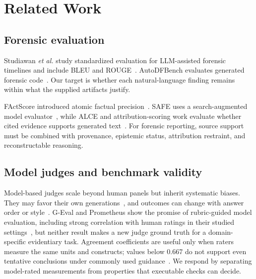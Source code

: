 \documentclass[conference]{IEEEtran}
\begin{document}
\section{Related Work}
\subsection{Forensic evaluation}
Studiawan \emph{et al.} study standardized evaluation for LLM-assisted forensic
timelines and include BLEU and ROUGE~\cite{studiawan2025}. AutoDFBench evaluates
generated forensic code~\cite{autodfbench}. Our target is whether each
natural-language finding remains within what the supplied artifacts justify.

FActScore introduced atomic factual precision~\cite{factscore}. SAFE uses a
search-augmented model evaluator~\cite{safe}, while ALCE and attribution-scoring
work evaluate whether cited evidence supports generated text~\cite{alce,attrscore}.
For forensic reporting, source support must be combined with provenance,
epistemic status, attribution restraint, and reconstructable reasoning.

\subsection{Model judges and benchmark validity}
Model-based judges scale beyond human panels but inherit systematic biases.
They may favor their own generations~\cite{panickssery2024}, and outcomes can
change with answer order or style~\cite{zheng2023,faireval}. G-Eval and
Prometheus show the promise of rubric-guided model evaluation, including strong
correlation with human ratings in their studied settings~\cite{geval,prometheus},
but neither result makes a new judge ground truth for a domain-specific
evidentiary task. Agreement coefficients are useful only when raters measure the
same units and constructs; values below 0.667 do not support even tentative
conclusions under commonly used guidance~\cite{krippendorff}. We respond by
separating model-rated measurements from properties that executable checks can
decide.
\end{document}
